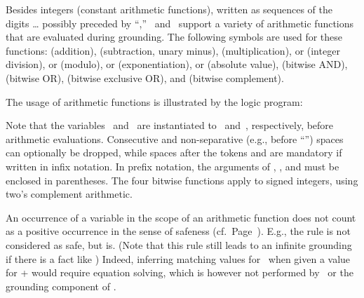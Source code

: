 Besides integers (constant arithmetic functions),
written as sequences of the digits \dots{}
possibly preceded by ``\code{-},''
\gringo\ and \clingo\ support a variety of arithmetic functions that
are evaluated during grounding.
The following symbols are used for these functions:
\code{+} (addition),
\code{-} (subtraction, unary minus),
\code{*} (multiplication),
\code{/} or  (integer division),
\code{\textbackslash} or  (modulo),
\code{**} or  (exponentiation),
\code{|$\cdot$|} or  (absolute value),
\code{\&} (bitwise AND),
 (bitwise OR),
\code{\^} (bitwise exclusive OR), and
\code{\textasciitilde} (bitwise complement).

\begin{example}\label{ex:arith:fun}
The usage of arithmetic functions is illustrated by the logic program:%
%

%
Note that the variables~ and~ are instantiated to~ and~,
respectively, before arithmetic evaluations.
Consecutive and non-separative (e.g., before ``\code{(}'')
spaces can optionally be dropped,
while spaces after the tokens  and  are mandatory
if written in infix notation.
In prefix notation, the arguments of , , and 
must be enclosed in parentheses.
The four bitwise functions apply to signed integers,
using two's complement arithmetic. %
\eexample
\end{example}

\begin{Note}
An occurrence of a variable in the scope of an arithmetic function
does not count as a positive occurrence in the sense of safeness (cf.\ Page~\pageref{pg:safe}).
E.g., the rule 
is not considered as safe, but  is.
(Note that this rule still leads to an infinite grounding
 if there is a fact like )
Indeed, inferring matching values for~ when given a value for +
would require equation solving, which is however not performed by
\gringo\ or the grounding component of \clingo.
%
\end{Note}

